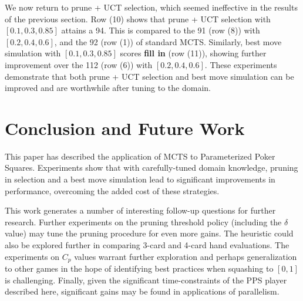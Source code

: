 \documentclass[letterpaper]{article}
\begin{document}
We now return to prune + UCT selection, which seemed ineffective in the results of the previous section. Row (10) shows that prune + UCT selection with $[0.1, 0.3, 0.85]$ attains a 94. This is compared to the 91 (row (8)) with $[0.2, 0.4, 0.6]$, and the 92 (row (1)) of standard MCTS. Similarly, best move simulation with $[0.1, 0.3, 0.85]$ scores {\bf fill in} (row (11)), showing further improvement over the 112 (row (6)) with $[0.2, 0.4, 0.6]$. These experiments demonstrate that both prune + UCT selection and best move simulation can be improved and are worthwhile after tuning to the domain.




\section{Conclusion and Future Work}

This paper has described the application of MCTS to Parameterized Poker Squares. Experiments show that with carefully-tuned domain knowledge, pruning in selection and a best move simulation lead to significant improvements in performance, overcoming the added cost of these strategies.

This work generates a number of interesting follow-up questions for further research. Further experiments on the pruning threshold policy (including the $\delta$ value) may tune the pruning procedure for even more gains. The heuristic could also be explored further in comparing 3-card and 4-card hand evaluations. The experiments on $C_p$ values warrant further exploration and perhaps generalization to other games in the hope of identifying best practices when squashing to $[0,1]$ is challenging. Finally, given the significant time-constraints of the PPS player described here, significant gains may be found in applications of parallelism.



\end{document}
